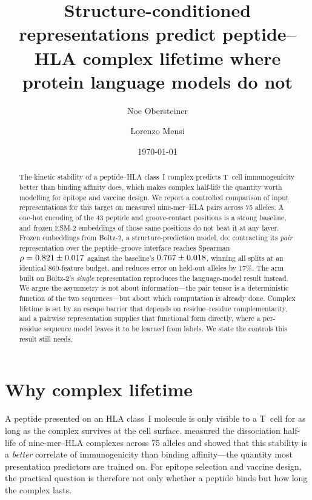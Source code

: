 \documentclass[11pt,a4paper]{article}
\title{Structure-conditioned representations predict peptide--HLA
complex lifetime where protein language models do not}
\author{Noe Obersteiner \and Lorenzo Mensi}
\date{\today}
\begin{document}
\maketitle

\begin{abstract}
\noindent
The kinetic stability of a peptide--HLA class~I complex predicts T~cell
immunogenicity better than binding affinity does, which makes complex
half-life the quantity worth modelling for epitope and vaccine design. We
report a controlled comparison of input representations for this target on
\ntotal{} measured nine-mer--HLA pairs across 75 alleles. A one-hot encoding of
the 43 peptide and groove-contact positions is a strong baseline, and frozen
ESM-2 embeddings of those same positions do not beat it at any layer. Frozen
embeddings from Boltz-2, a structure-prediction model, do: contracting its
\emph{pair} representation over the peptide--groove interface reaches Spearman
$\rho = 0.821{} \pm 0.017{}$ against the baseline's $0.767{} \pm
0.018{}$, winning all \nsplits{} splits at an identical 860-feature budget,
and reduces error on held-out alleles by 17\%. The arm built on Boltz-2's
\emph{single} representation reproduces the language-model result instead. We
argue the asymmetry is not about information---the pair tensor is a
deterministic function of the two sequences---but about which computation is
already done. Complex lifetime is set by an escape barrier that depends on
residue--residue complementarity, and a pairwise representation supplies that
functional form directly, where a per-residue sequence model leaves it to be
learned from labels. We state the controls this result still needs.
\end{abstract}

\section{Why complex lifetime}
\label{sec:why}

A peptide presented on an HLA class~I molecule is only visible to a T~cell for
as long as the complex survives at the cell surface. \citet{rasmussen2016}
measured the dissociation half-life of \ntotal{} nine-mer--HLA complexes across
75 alleles and showed that this stability is a \emph{better} correlate of
immunogenicity than binding affinity---the quantity most presentation
predictors are trained on. For epitope selection and vaccine design, the
practical question is therefore not only whether a peptide binds but how long
the complex lasts.
\end{document}
